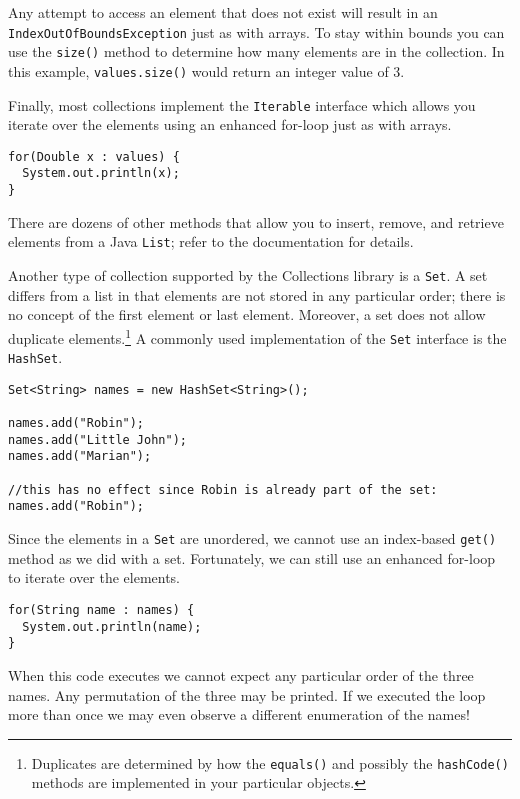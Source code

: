 Any attempt to access an element that does not exist will
result in an \texttt{IndexOutOfBoundsException} just as 
with arrays.  To stay within bounds you can use the \texttt{size()}
method to determine how many elements are in the collection.
In this example, \texttt{values.size()} would return an 
integer value of 3.

Finally, most collections implement the \texttt{Iterable}
interface which allows you iterate over the elements using an 
enhanced for-loop just as with arrays.

\begin{verbatim}
for(Double x : values) {
  System.out.println(x);
}
\end{verbatim}

There are dozens of other methods that allow you to insert, remove, and
retrieve elements from a Java \texttt{List}; refer to the documentation
for details.

Another type of collection supported by the Collections library is a 
\texttt{Set}.  A set differs from a list in that elements are not
stored in any particular order; there is no concept of the first element
or last element.  Moreover, a set does not allow duplicate elements.\footnote{Duplicates
are determined by how the \texttt{equals()} and possibly the
\texttt{hashCode()} methods are implemented in your particular
objects.}  A commonly used implementation of the \texttt{Set}
interface is the \texttt{HashSet}.  

\begin{verbatim}
Set<String> names = new HashSet<String>();

names.add("Robin");
names.add("Little John");
names.add("Marian");

//this has no effect since Robin is already part of the set:
names.add("Robin");
\end{verbatim}

Since the elements in a \texttt{Set} are unordered, 
we cannot use an index-based \texttt{get()} method
as we did with a set.  Fortunately, we can still use an enhanced
for-loop to iterate over the elements.

\begin{verbatim}
for(String name : names) {
  System.out.println(name);
}
\end{verbatim}

When this code executes we cannot expect any particular order of
the three names.  Any permutation of the three may be printed.  If
we executed the loop more than once we may even observe a different
enumeration of the names!

